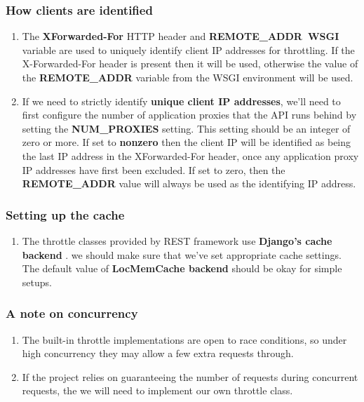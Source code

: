 \documentclass[12pt]{article}
\begin{document}
\subsubsection{How clients are identified}
\begin{enumerate}
    \item The \textbf{X\-Forwarded-For} HTTP header and \textbf{REMOTE\_ADDR\ WSGI} variable are used to uniquely identify client IP addresses for throttling. If the X-Forwarded-For header is present then it will be used, otherwise the value of the \textbf{REMOTE\_ADDR} variable from the WSGI environment will be used.
    \item If we need to strictly identify \textbf{unique client IP addresses}, we'll need to first configure the number of application proxies that the API runs behind by setting the \textbf{NUM\_PROXIES} setting. This setting should be an integer of zero or more. If set to \textbf{non\-zero} then the client IP will be identified as being the last IP address in the X\-Forwarded-For header, once any application proxy IP addresses have first been excluded. If set to zero, then the \textbf{REMOTE\_ADDR} value will always be used as the identifying IP address.
\end{enumerate}
\subsubsection{Setting up the cache}
\begin{enumerate}
    \item The throttle classes provided by REST framework use \textbf{Django's cache backend} . we should make sure that we've set appropriate cache settings. The default value of \textbf{LocMemCache backend} should be okay for simple setups.
\end{enumerate}
\subsubsection{A note on concurrency}
\begin{enumerate}
    \item The built-in throttle implementations are open to race conditions, so under high concurrency they may allow a few extra requests through.
    \item If the project relies on guaranteeing the number of requests during concurrent requests, the we  will need to implement our own throttle class.
\end{enumerate}
\end{document}
